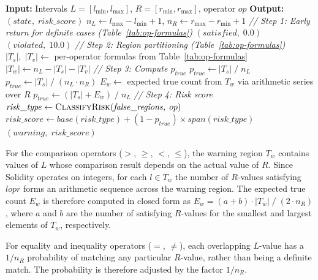 \documentclass[pdflatex,sn-basic]{sn-jnl}%
\theoremstyle{thmstyleone}%
\theoremstyle{thmstyletwo}%
\theoremstyle{thmstylethree}%
\begin{document}
\begin{algorithm}[t]
\caption{Interval Comparison with Risk Score}
\label{alg:interval-compare}
\begin{algorithmic}[1]
\State \textbf{Input:} Intervals $L = [l_{\min}, l_{\max}]$, $R = [r_{\min}, r_{\max}]$, operator $op$
\State \textbf{Output:} $(\mathit{state},\; \mathit{risk\_score})$
\State $n_L \gets l_{\max} - l_{\min} + 1$, \; $n_R \gets r_{\max} - r_{\min} + 1$
\Statex
\Statex \textit{// Step 1: Early return for definite cases (Table~\ref{tab:op-formulas})}
    \State \Return $(\textit{satisfied},\; 0.0)$
    \State \Return $(\textit{violated},\; 10.0)$
\EndIf
\Statex
\Statex \textit{// Step 2: Region partitioning (Table~\ref{tab:op-formulas})}
\State $|T_s|,\; |T_v| \gets$ per-operator formulas from Table~\ref{tab:op-formulas}
\State $|T_w| \gets n_L - |T_s| - |T_v|$
\Statex
\Statex \textit{// Step 3: Compute $p_{\mathit{true}}$}
    \State $p_{\mathit{true}} \gets |T_s| \;/\; n_L$
    \State $p_{\mathit{true}} \gets |T_s| \;/\; (n_L \cdot n_R)$ 
\Else \Comment{$>,\; \geq,\; <,\; \leq$}
    \State $E_w \gets$ expected true count from $T_w$ via arithmetic series over $R$
    \State $p_{\mathit{true}} \gets (|T_s| + E_w) \;/\; n_L$
\EndIf
\Statex
\Statex \textit{// Step 4: Risk score}
\State $\mathit{risk\_type} \gets \textsc{ClassifyRisk}(\mathit{false\_regions},\; op)$
\State $\mathit{risk\_score} \gets \mathit{base}(\mathit{risk\_type}) + (1 - p_{\mathit{true}}) \times \mathit{span}(\mathit{risk\_type})$
\State \Return $(\textit{warning},\; \mathit{risk\_score})$
\end{algorithmic}
\end{algorithm}

For the comparison operators ($>$, $\geq$, $<$, $\leq$), the warning region $T_w$ contains values of $L$ whose comparison result depends on the actual value of $R$.
Since Solidity operates on integers, for each $l \in T_w$ the number of $R$-values satisfying $l \mathrel{op} r$ forms an arithmetic sequence across the warning region.
The expected true count $E_w$ is therefore computed in closed form as $E_w = (a + b) \cdot |T_w| \;/\; (2 \cdot n_R)$, where $a$ and $b$ are the number of satisfying $R$-values for the smallest and largest elements of $T_w$, respectively.

For equality and inequality operators ($=$, $\neq$), each overlapping $L$-value has a $1/n_R$ probability of matching any particular $R$-value, rather than being a definite match.
The probability is therefore adjusted by the factor $1/n_R$.
\end{document}
